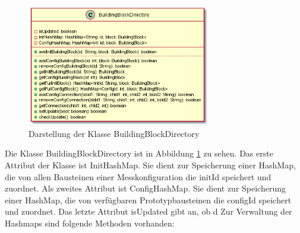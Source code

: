 \documentclass[parskip=full]{scrartcl}
\begin{document}
\begin{figure}[htbp]
	\begin{center}
		\includegraphics[width = 8cm]{Grafiken/BuildingBlockDirectory.png}
		\caption{Darstellung der Klasse BuildingBlockDirectory}
		\label{BuildingBlockDirectory}
	\end{center}
\end{figure}
Die Klasse BuildingBlockDirectory ist in Abbildung \ref{BuildingBlockDirectory} zu sehen.
Das erste Attribut der Klasse ist InitHashMap. Sie dient zur Speicherung einer HashMap, die von allen Bausteinen einer Messkonfiguration die initId speichert und zuordnet. Als zweites Attribut ist ConfigHashMap. Sie dient zur Speicherung einer HashMap, die von verfügbaren Prototypbausteinen die configId speichert und zuordnet. Das letzte Attribut isUpdated gibt an, ob d
Zur Verwaltung der Hashmaps sind folgende Methoden vorhanden:
\end{document}
